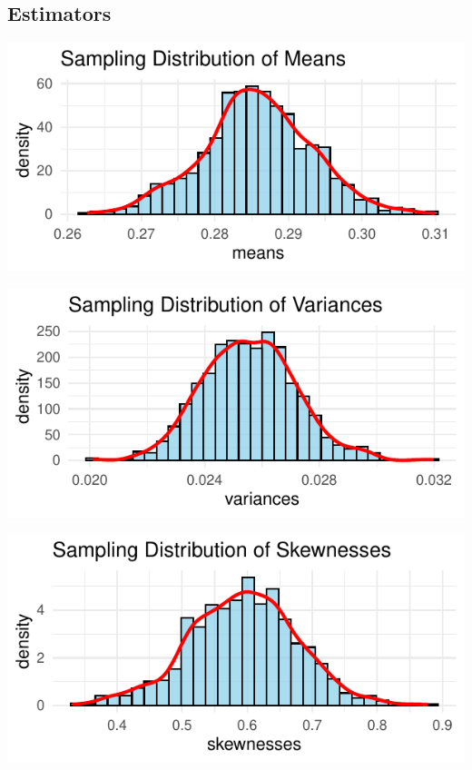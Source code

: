 \documentclass{article}\usepackage[]{graphicx}\usepackage[]{xcolor}
\makeatletter
\def\maxwidth{ %
  \ifdim\Gin@nat@width>\linewidth
    \linewidth
  \else
    \Gin@nat@width
  \fi
}
\newenvironment{knitrout}{}{} %
\makeatother
\begin{document}
\subsection{Estimators}
\begin{knitrout}
\color{fgcolor}
\includegraphics[width=\maxwidth]{figure/unnamed-chunk-6-1} 
\end{knitrout}

\begin{knitrout}
\color{fgcolor}
\includegraphics[width=\maxwidth]{figure/unnamed-chunk-7-1} 
\end{knitrout}

\begin{knitrout}
\color{fgcolor}
\includegraphics[width=\maxwidth]{figure/unnamed-chunk-8-1} 
\end{knitrout}
\end{document}
